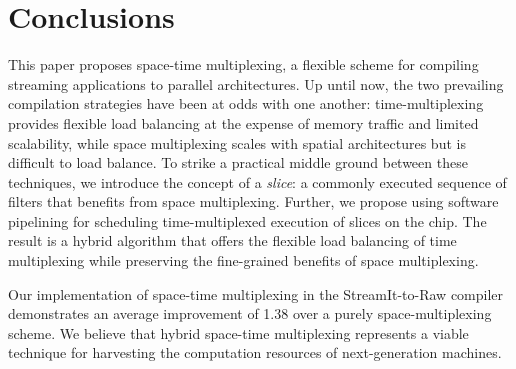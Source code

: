 \section{Conclusions}
\label{sec:conclusion}

This paper proposes space-time multiplexing, a flexible scheme for
compiling streaming applications to parallel architectures.  Up
until now, the two prevailing compilation strategies have been at odds
with one another: time-multiplexing provides flexible load balancing
at the expense of memory traffic and limited scalability, while space
multiplexing scales with spatial architectures but is difficult to
load balance.  To strike a practical middle ground between these
techniques, we introduce the concept of a {\it slice}: a commonly
executed sequence of filters that benefits from space multiplexing.
Further, we propose using software pipelining for scheduling
time-multiplexed execution of slices on the chip.  The result is a
hybrid algorithm that offers the flexible load balancing of time
multiplexing while preserving the fine-grained benefits of space
multiplexing.


Our implementation of space-time multiplexing in the StreamIt-to-Raw
compiler demonstrates an average improvement of 1.38 over a
purely space-multiplexing scheme.  We believe that hybrid space-time
multiplexing represents a viable technique for harvesting the
computation resources of next-generation machines.

